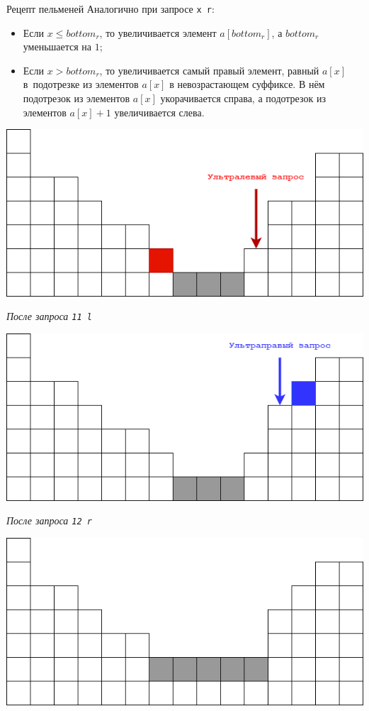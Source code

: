 \begin{tutorial}{Рецепт пельменей}
Аналогично при запросе \texttt{x r}:
\begin{itemize}
  \item Если $x \le bottom_r$, то увеличивается элемент $a[bottom_r]$, а $bottom_r$ уменьшается на $1$;
  \item Если $x > bottom_r$, то увеличивается самый правый элемент, равный $a[x]$ в~подотрезке из элементов $a[x]$ в невозрастающем суффиксе. В нём подотрезок из элементов $a[x]$ укорачивается справа, а подотрезок из элементов $a[x] + 1$ увеличивается слева.
\end{itemize}

\begin{center}
  \includegraphics [scale = 0.8] {2.png}

  \textit{После запроса \texttt{11 l}}
\end{center}

\begin{center}
  \includegraphics [scale = 0.8] {3.png}

  \textit{После запроса \texttt{12 r}}
\end{center}


\begin{center}
  \includegraphics [scale = 0.8] {4.png}


\end{center}
\end{tutorial}
